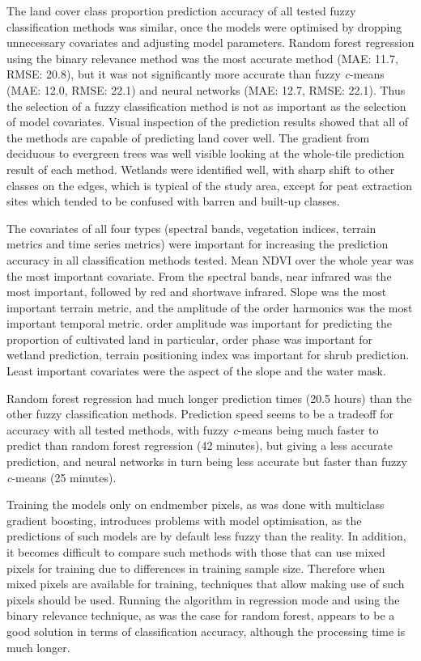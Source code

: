 \documentclass[a4paper,12pt]{scrbook}
\begin{document}
The land cover class proportion prediction accuracy of all tested fuzzy classification methods was similar, once the models were optimised by dropping unnecessary covariates and adjusting model parameters. Random forest regression using the binary relevance method was the most accurate method (MAE: 11.7, RMSE: 20.8), but it was not significantly more accurate than fuzzy \textit{c}-means (MAE: 12.0, RMSE: 22.1) and neural networks (MAE: 12.7, RMSE: 22.1). Thus the selection of a fuzzy classification method is not as important as the selection of model covariates. Visual inspection of the prediction results showed that all of the methods are capable of predicting land cover well. The gradient from deciduous to evergreen trees was well visible looking at the whole-tile prediction result of each method. Wetlands were identified well, with sharp shift to other classes on the edges, which is typical of the study area, except for peat extraction sites which tended to be confused with barren and built-up classes.

The covariates of all four types (spectral bands, vegetation indices, terrain metrics and time series metrics) were important for increasing the prediction accuracy in all classification methods tested. Mean NDVI over the whole year was the most important covariate. From the spectral bands, near infrared was the most important, followed by red and shortwave infrared. Slope was the most important terrain metric, and the amplitude of the  order harmonics was the most important temporal metric.  order amplitude was important for predicting the proportion of cultivated land in particular,  order phase was important for wetland prediction, terrain positioning index was important for shrub prediction. Least important covariates were the aspect of the slope and the water mask.

Random forest regression had much longer prediction times (20.5 hours) than the other fuzzy classification methods. Prediction speed seems to be a tradeoff for accuracy with all tested methods, with fuzzy \textit{c}-means being much faster to predict than random forest regression (42 minutes), but giving a less accurate prediction, and neural networks in turn being less accurate but faster than fuzzy \textit{c}-means (25 minutes).


Training the models only on endmember pixels, as was done with multiclass gradient boosting, introduces problems with model optimisation, as the predictions of such models are by default less fuzzy than the reality. In addition, it becomes difficult to compare such methods with those that can use mixed pixels for training due to differences in training sample size. Therefore when mixed pixels are available for training, techniques that allow making use of such pixels should be used. Running the algorithm in regression mode and using the binary relevance technique, as was the case for random forest, appears to be a good solution in terms of classification accuracy, although the processing time is much longer.
\end{document}
